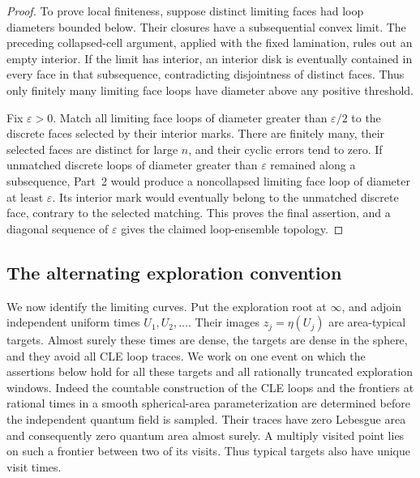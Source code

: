 \begin{proof}
To prove local finiteness, suppose distinct limiting faces had loop
diameters bounded below.  Their closures have a subsequential convex
limit.  The preceding collapsed-cell argument, applied with the fixed
lamination, rules out an empty interior.  If the limit has interior, an
interior disk is eventually contained in every face in that subsequence,
contradicting disjointness of distinct faces.  Thus only finitely many
limiting face loops have diameter above any positive threshold.

Fix $\varepsilon>0$.  Match all limiting face loops of diameter greater
than $\varepsilon/2$ to the discrete faces selected by their interior
marks.  There are finitely many, their selected faces are distinct for
large $n$, and their cyclic errors tend to zero.  If unmatched discrete
loops of diameter greater than $\varepsilon$ remained along a subsequence,
Part~2 would produce a noncollapsed limiting face loop of diameter at
least $\varepsilon$.  Its interior mark would eventually belong to the
unmatched discrete face, contrary to the selected matching.  This proves
the final assertion, and a diagonal sequence of $\varepsilon$ gives the
claimed loop-ensemble topology.
\end{proof}

\subsection{The alternating exploration convention}

We now identify the limiting curves.  Put the exploration root at
$\infty$, and adjoin independent uniform times $U_1,U_2,\ldots$.
Their images $z_j=\eta(U_j)$ are area-typical targets.  Almost surely
these times are dense, the targets are dense in the sphere, and they
avoid all CLE loop traces.  We work on
one event on which the assertions below hold for all these targets and
all rationally truncated exploration windows.
Indeed the countable construction of the CLE loops and the frontiers
at rational times in a smooth spherical-area parameterization
are determined before the independent quantum field is sampled.
Their traces have zero Lebesgue area and consequently zero quantum
area almost surely.  A multiply visited point lies on such a frontier
between two of its visits.  Thus typical targets also have unique
visit times.

